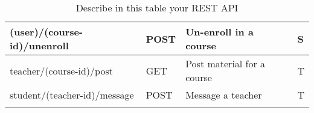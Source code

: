 \begin{longtable}{|p{}|p{} |p{}|p{}|}
\hline
(user)/(course-id)/unenroll
&   %
POST
&   %
Un-enroll in a course
&   %
S\\
\hline

\hline
teacher/(course-id)/post
&   %
GET
&   %
Post material for a course
&   %
T\\
\hline

\hline
student/(teacher-id)/message
&   %
POST
&   %
Message a teacher
&   %
T\\
\hline


\caption{Describe in this table your REST API}
\label{tab:termGlossary}
\end{longtable}